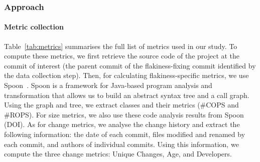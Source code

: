 \subsubsection{Approach}
\paragraph{Metric collection}

Table~\ref{tab:metrics} summarises the full list of metrics used in our study.
To compute these metrics, we first retrieve the source code of the project at the commit of interest (\ie the parent commit of the flakiness-fixing commit identified by the data collection step).
Then, for calculating flakiness-specific metrics, we use Spoon~\cite{spoon}.
Spoon is a framework for Java-based program analysis and transformation that allows us to build an abstract syntax tree and a call graph.
Using the graph and tree, we extract classes and their metrics (\eg \#COPS and \#ROPS). 
For size metrics, we also use these code analysis results from Spoon (\eg DOI). 
As for change metrics, we analyse the change history and extract the following information: the date of each commit, files modified and renamed by each commit, and authors of individual commits. Using this information, we compute the three change metrics: Unique Changes, Age, and Developers.

